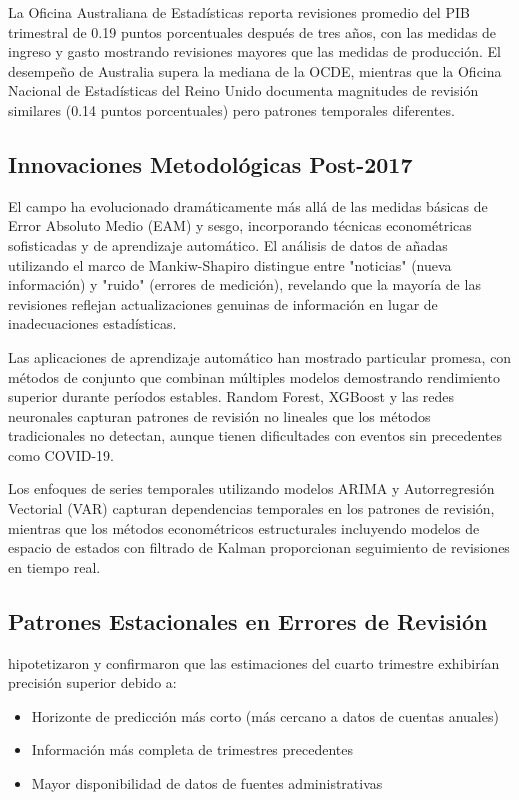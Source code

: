 \documentclass[12pt,a4paper]{article}
\begin{document}
La Oficina Australiana de Estadísticas reporta revisiones promedio del PIB trimestral de 0.19 puntos porcentuales después de tres años, con las medidas de ingreso y gasto mostrando revisiones mayores que las medidas de producción. El desempeño de Australia supera la mediana de la OCDE, mientras que la Oficina Nacional de Estadísticas del Reino Unido documenta magnitudes de revisión similares (0.14 puntos porcentuales) pero patrones temporales diferentes.

\subsection{Innovaciones Metodológicas Post-2017}

El campo ha evolucionado dramáticamente más allá de las medidas básicas de Error Absoluto Medio (EAM) y sesgo, incorporando técnicas econométricas sofisticadas y de aprendizaje automático. El análisis de datos de añadas utilizando el marco de Mankiw-Shapiro distingue entre "noticias" (nueva información) y "ruido" (errores de medición), revelando que la mayoría de las revisiones reflejan actualizaciones genuinas de información en lugar de inadecuaciones estadísticas.

Las aplicaciones de aprendizaje automático han mostrado particular promesa, con métodos de conjunto que combinan múltiples modelos demostrando rendimiento superior durante períodos estables. Random Forest, XGBoost y las redes neuronales capturan patrones de revisión no lineales que los métodos tradicionales no detectan, aunque tienen dificultades con eventos sin precedentes como COVID-19.

Los enfoques de series temporales utilizando modelos ARIMA y Autorregresión Vectorial (VAR) capturan dependencias temporales en los patrones de revisión, mientras que los métodos econométricos estructurales incluyendo modelos de espacio de estados con filtrado de Kalman proporcionan seguimiento de revisiones en tiempo real.

\subsection{Patrones Estacionales en Errores de Revisión}

\citet{pavia2017} hipotetizaron y confirmaron que las estimaciones del cuarto trimestre exhibirían precisión superior debido a:

\begin{itemize}
\item Horizonte de predicción más corto (más cercano a datos de cuentas anuales)
\item Información más completa de trimestres precedentes  
\item Mayor disponibilidad de datos de fuentes administrativas
\end{itemize}
\end{document}
